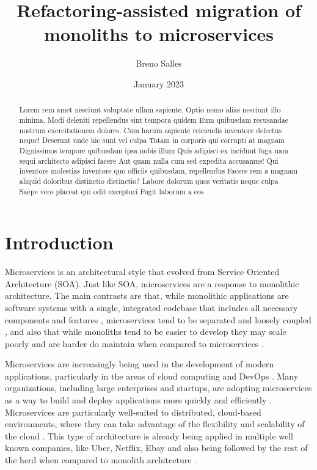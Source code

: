 \documentclass[conference]{IEEEtran}
\title{Refactoring-assisted migration of monoliths to microservices}
\author{Breno Salles} \date{January 2023}
\begin{document}
\maketitle

\begin{abstract}

  Lorem rem amet nesciunt voluptate ullam sapiente. Optio nemo alias nesciunt
  illo minima. Modi deleniti repellendus sint tempora quidem Eum quibusdam
  recusandae nostrum exercitationem dolores. Cum harum sapiente reiciendis
  inventore delectus neque! Deserunt unde hic sunt vel culpa Totam in corporis
  qui corrupti at magnam Dignissimos tempore quibusdam ipsa nobis illum Quis
  adipisci ex incidunt fuga nam sequi architecto adipisci facere Aut quam nulla
  cum sed expedita accusamus! Qui inventore molestias inventore quo officiis
  quibusdam, repellendus Facere rem a magnam aliquid doloribus distinctio
  distinctio? Labore dolorum quos veritatis neque culpa Saepe vero placeat qui
  odit excepturi Fugit laborum a eos

\end{abstract}

\section{Introduction}

Microservices is an architectural style that evolved from Service Oriented
Architecture (SOA). Just like SOA, microservices are a response to monolithic
architecture. The main contrasts are that, while monolithic applications are
software systems with a single, integrated codebase that includes all necessary
components and features \cite{kazanavivcius2019migrating}, microservices tend
to be separated and loosely coupled \cite{newman2021building}, and also that
while monoliths tend to be easier to develop they may scale poorly and are
harder do maintain when compared to microservices \cite{newman2019monolith}.

Microservices are increasingly being used in the development of modern
applications, particularly in the areas of cloud computing and DevOps
\cite{ren2018migrating}. Many organizations, including large enterprises and
startups, are adopting microservices as a way to build and deploy applications
more quickly and efficiently \cite{richardson-microservices}. Microservices are
particularly well-suited to distributed, cloud-based environments, where they
can take advantage of the flexibility and scalability of the cloud
\cite{fowler-microservices-prerequisites}. This type of architecture is already
being applied in multiple well known companies, like Uber, Netflix, Ebay
\cite{microservices-users} and also being followed by the rest of the herd when compared to monolith architecture \cite{taibi2017processes}.
\end{document}
